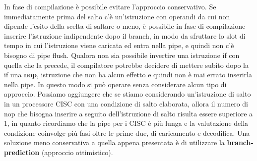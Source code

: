 In fase di compilazione è possibile evitare l'approccio conservativo. Se immediatamente prima del salto c'è un'istruzione con operandi da cui non dipende l'esito della scelta di saltare o meno, è possibile in fase di compilazione inserire l'istruzione indipendente dopo il branch, in modo da sfruttare lo slot di tempo in cui l'istruzione viene caricata ed entra nella pipe, e quindi non c'è bisogno di pipe flush. Qualora non sia possibile invertire una istruzione if con quella che la precede, il compilatore potrebbe decidere di mettere subito dopo la if una \textbf{nop}, istruzione che non ha alcun effetto e quindi non è mai errato inserirla nella pipe. In questo modo si può operare senza considerare alcun tipo di approccio. Possiamo aggiungere che se stiamo considerando un'istruzione di salto in un processore CISC con una condizione di salto elaborata, allora il numero di nop che bisogna inserire a seguito dell'istruzione di salto risulta essere superiore a 1, in quanto ricordiamo che la pipe per i CISC è più lunga e la valutazione della condizione coinvolge più fasi oltre le prime due, di caricamento e decodifica.
Una soluzione meno conservativa a quella appena presentata è di utilizzare la \textbf{branch-prediction} (approccio ottimistico).




